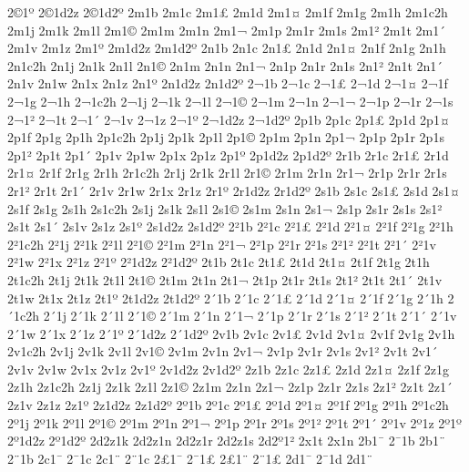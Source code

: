 {2^^a91^^ba
2^^a91d2z
2^^a91d2^^ba
2m1b
2m1c
2m1^^a3
2m1d
2m1^^a4
2m1f
2m1g
2m1h
2m1c2h
2m1j
2m1k
2m1l
2m1^^a9
2m1m
2m1n
2m1^^ac
2m1p
2m1r
2m1s
2m1^^b2
2m1t
2m1^^b4
2m1v
2m1z
2m1^^ba
2m1d2z
2m1d2^^ba
2n1b
2n1c
2n1^^a3
2n1d
2n1^^a4
2n1f
2n1g
2n1h
2n1c2h
2n1j
2n1k
2n1l
2n1^^a9
2n1m
2n1n
2n1^^ac
2n1p
2n1r
2n1s
2n1^^b2
2n1t
2n1^^b4
2n1v
2n1w
2n1x
2n1z
2n1^^ba
2n1d2z
2n1d2^^ba
2^^ac1b
2^^ac1c
2^^ac1^^a3
2^^ac1d
2^^ac1^^a4
2^^ac1f
2^^ac1g
2^^ac1h
2^^ac1c2h
2^^ac1j
2^^ac1k
2^^ac1l
2^^ac1^^a9
2^^ac1m
2^^ac1n
2^^ac1^^ac
2^^ac1p
2^^ac1r
2^^ac1s
2^^ac1^^b2
2^^ac1t
2^^ac1^^b4
2^^ac1v
2^^ac1z
2^^ac1^^ba
2^^ac1d2z
2^^ac1d2^^ba
2p1b
2p1c
2p1^^a3
2p1d
2p1^^a4
2p1f
2p1g
2p1h
2p1c2h
2p1j
2p1k
2p1l
2p1^^a9
2p1m
2p1n
2p1^^ac
2p1p
2p1r
2p1s
2p1^^b2
2p1t
2p1^^b4
2p1v
2p1w
2p1x
2p1z
2p1^^ba
2p1d2z
2p1d2^^ba
2r1b
2r1c
2r1^^a3
2r1d
2r1^^a4
2r1f
2r1g
2r1h
2r1c2h
2r1j
2r1k
2r1l
2r1^^a9
2r1m
2r1n
2r1^^ac
2r1p
2r1r
2r1s
2r1^^b2
2r1t
2r1^^b4
2r1v
2r1w
2r1x
2r1z
2r1^^ba
2r1d2z
2r1d2^^ba
2s1b
2s1c
2s1^^a3
2s1d
2s1^^a4
2s1f
2s1g
2s1h
2s1c2h
2s1j
2s1k
2s1l
2s1^^a9
2s1m
2s1n
2s1^^ac
2s1p
2s1r
2s1s
2s1^^b2
2s1t
2s1^^b4
2s1v
2s1z
2s1^^ba
2s1d2z
2s1d2^^ba
2^^b21b
2^^b21c
2^^b21^^a3
2^^b21d
2^^b21^^a4
2^^b21f
2^^b21g
2^^b21h
2^^b21c2h
2^^b21j
2^^b21k
2^^b21l
2^^b21^^a9
2^^b21m
2^^b21n
2^^b21^^ac
2^^b21p
2^^b21r
2^^b21s
2^^b21^^b2
2^^b21t
2^^b21^^b4
2^^b21v
2^^b21w
2^^b21x
2^^b21z
2^^b21^^ba
2^^b21d2z
2^^b21d2^^ba
2t1b
2t1c
2t1^^a3
2t1d
2t1^^a4
2t1f
2t1g
2t1h
2t1c2h
2t1j
2t1k
2t1l
2t1^^a9
2t1m
2t1n
2t1^^ac
2t1p
2t1r
2t1s
2t1^^b2
2t1t
2t1^^b4
2t1v
2t1w
2t1x
2t1z
2t1^^ba
2t1d2z
2t1d2^^ba
2^^b41b
2^^b41c
2^^b41^^a3
2^^b41d
2^^b41^^a4
2^^b41f
2^^b41g
2^^b41h
2^^b41c2h
2^^b41j
2^^b41k
2^^b41l
2^^b41^^a9
2^^b41m
2^^b41n
2^^b41^^ac
2^^b41p
2^^b41r
2^^b41s
2^^b41^^b2
2^^b41t
2^^b41^^b4
2^^b41v
2^^b41w
2^^b41x
2^^b41z
2^^b41^^ba
2^^b41d2z
2^^b41d2^^ba
2v1b
2v1c
2v1^^a3
2v1d
2v1^^a4
2v1f
2v1g
2v1h
2v1c2h
2v1j
2v1k
2v1l
2v1^^a9
2v1m
2v1n
2v1^^ac
2v1p
2v1r
2v1s
2v1^^b2
2v1t
2v1^^b4
2v1v
2v1w
2v1x
2v1z
2v1^^ba
2v1d2z
2v1d2^^ba
2z1b
2z1c
2z1^^a3
2z1d
2z1^^a4
2z1f
2z1g
2z1h
2z1c2h
2z1j
2z1k
2z1l
2z1^^a9
2z1m
2z1n
2z1^^ac
2z1p
2z1r
2z1s
2z1^^b2
2z1t
2z1^^b4
2z1v
2z1z
2z1^^ba
2z1d2z
2z1d2^^ba
2^^ba1b
2^^ba1c
2^^ba1^^a3
2^^ba1d
2^^ba1^^a4
2^^ba1f
2^^ba1g
2^^ba1h
2^^ba1c2h
2^^ba1j
2^^ba1k
2^^ba1l
2^^ba1^^a9
2^^ba1m
2^^ba1n
2^^ba1^^ac
2^^ba1p
2^^ba1r
2^^ba1s
2^^ba1^^b2
2^^ba1t
2^^ba1^^b4
2^^ba1v
2^^ba1z
2^^ba1^^ba
2^^ba1d2z
2^^ba1d2^^ba
2d2z1k
2d2z1n
2d2z1r
2d2z1s
2d2^^ba1^^b2
2x1t
2x1n
2b1^^af
2^^af1b
2b1^^a8
2^^a81b
2c1^^af
2^^af1c
2c1^^a8
2^^a81c
2^^a31^^af
2^^af1^^a3
2^^a31^^a8
2^^a81^^a3
2d1^^af
2^^af1d
2d1^^a8
}
